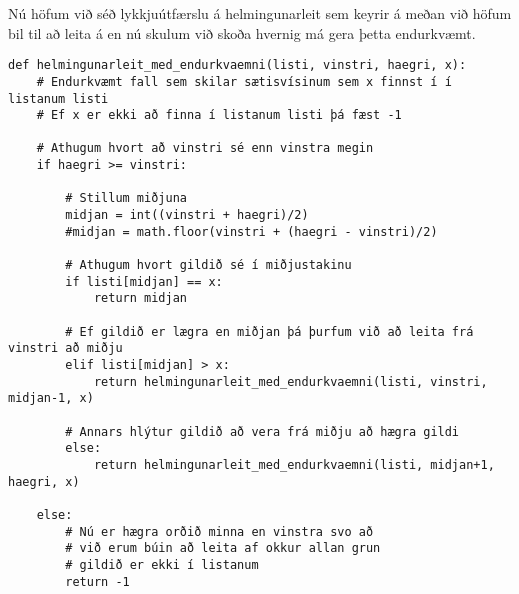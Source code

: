 Nú höfum við séð lykkjuútfærslu á helmingunarleit sem keyrir á meðan við höfum bil til að leita á en nú skulum við skoða hvernig má gera þetta endurkvæmt.

\begin{lstlisting}[caption=Helmingunarleit að tölu í röðuðum lista með endurkvæmni, label=lst:reiknirit-helm-end]
def helmingunarleit_med_endurkvaemni(listi, vinstri, haegri, x): 
	# Endurkvæmt fall sem skilar sætisvísinum sem x finnst í í listanum listi
	# Ef x er ekki að finna í listanum listi þá fæst -1
	
	# Athugum hvort að vinstri sé enn vinstra megin
	if haegri >= vinstri: 
	
		# Stillum miðjuna
		midjan = int((vinstri + haegri)/2)
		#midjan = math.floor(vinstri + (haegri - vinstri)/2)
		
		# Athugum hvort gildið sé í miðjustakinu
		if listi[midjan] == x: 
			return midjan 
		
		# Ef gildið er lægra en miðjan þá þurfum við að leita frá vinstri að miðju
		elif listi[midjan] > x: 
			return helmingunarleit_med_endurkvaemni(listi, vinstri, midjan-1, x) 
	
		# Annars hlýtur gildið að vera frá miðju að hægra gildi
		else: 
			return helmingunarleit_med_endurkvaemni(listi, midjan+1, haegri, x) 
	
	else: 
		# Nú er hægra orðið minna en vinstra svo að
		# við erum búin að leita af okkur allan grun
		# gildið er ekki í listanum
		return -1
\end{lstlisting}





\newpage

